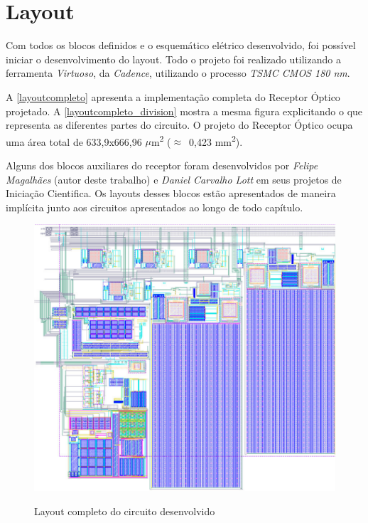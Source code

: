 \section{Layout}

Com todos os blocos definidos e o esquemático elétrico desenvolvido, foi possível iniciar o desenvolvimento do layout. Todo o projeto foi realizado utilizando a ferramenta \textit{Virtuoso}, da \textit{Cadence}, utilizando o processo \textit{TSMC CMOS 180 nm}.

A \autoref{layoutcompleto} apresenta a implementação completa do Receptor Óptico projetado. A \autoref{layoutcompleto_division} mostra a mesma figura explicitando o que representa as diferentes partes do circuito. O projeto do Receptor Óptico ocupa uma área total de 633,9x666,96 $\mu$m\textsuperscript{2} ($\approx$~0,423 mm\textsuperscript{2}).

Alguns dos blocos auxiliares do receptor foram desenvolvidos por \textit{Felipe Magalhães} (autor deste trabalho) e \textit{Daniel Carvalho Lott} em seus projetos de Iniciação Cientifica. Os layouts desses blocos estão apresentados de maneira implícita junto aos circuitos apresentados ao longo de todo capítulo.

\begin{figure}[!h]
 \centering
    \caption{Layout completo do circuito desenvolvido} 
    \includegraphics[scale=1, angle = 90]{Projeto/Layout/Imagens/Circuito Completo.png}
    \label{layoutcompleto}
\end{figure}

